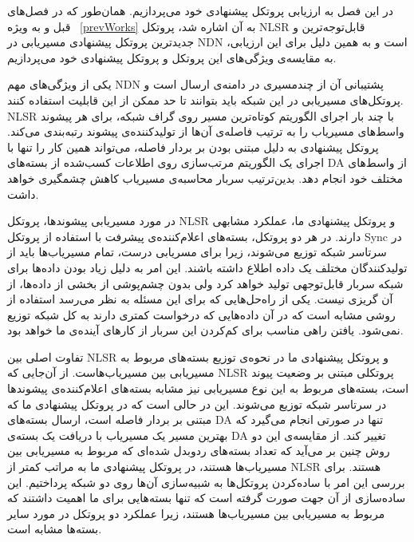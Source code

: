 
در این فصل به ارزیابی پروتکل پیشنهادی خود می‌پردازیم. همان‌طور که در فصل‌های قبل و به ویژه ~\ref{prevWorks} به آن اشاره شد، پروتکل NLSR قابل‌توجه‌ترین و جدیدترین پروتکل پیشنهادی مسیریابی در NDN است و به همین دلیل برای این ارزیابی، به مقایسه‌ی ویژگی‌های این پروتکل و پروتکل پیشنهادی خود می‌پردازیم.

یکی از ویژگی‌های مهم NDN پشتیبانی آن از چندمسیری در دامنه‌ی ارسال است و پروتکل‌های مسیریابی در این شبکه باید بتوانند تا حد ممکن از این قابلیت استفاده کنند. NLSR با چند بار اجرای الگوریتم کوتاه‌ترین مسیر روی گراف شبکه، برای هر پیشوند واسط‌های مسیریاب را به ترتیب فاصله‌ی آن‌ها از تولید‌کننده‌ی پیشوند رتبه‌بندی می‌کند. پروتکل پیشنهادی به دلیل مبتنی بودن بر بردار فاصله، می‌تواند همین کار را تنها با اجرای یک الگوریتم مرتب‌سازی روی اطلاعات کسب‌شده از بسته‌های DA از واسط‌های مختلف خود انجام دهد. بدین‌ترتیب سربار محاسبه‌ی مسیریاب کاهش چشمگیری خواهد داشت.

در مورد مسیریابی پیشوند‌ها، پروتکل NLSR و پروتکل پیشنهادی ما، عملکرد مشابهی دارند. در هر دو پروتکل، بسته‌های اعلام‌کننده‌ی پیشرفت با استفاده از پروتکل Sync در سرتاسر شبکه توزیع می‌شوند، زیرا برای مسریابی درست، تمام مسیریاب‌ها باید از تولیدکنندگان مختلف یک داده اطلاع داشته باشند. این امر به دلیل زیاد بودن داده‌ها برای شبکه سربار قابل‌توجهی تولید خواهد کرد ولی بدون چشم‌پوشی از بخشی از داده‌ها، از آن گریزی نیست. یکی از راه‌حل‌هایی که برای این مسئله به نظر می‌رسد استفاده از روشی مشابه \cite{two-layer} است که در آن داده‌هایی که درخواست کمتری دارند به کل شبکه توزیع نمی‌شود. یافتن راهی مناسب برای کم‌کردن این سربار از کارهای آینده‌ی ما خواهد بود.

تفاوت اصلی بین NLSR و پروتکل پیشنهادی ما در نحوه‌ی توزیع بسته‌های مربوط به مسیریابی بین مسیریاب‌هاست. از آن‌جایی که NLSR پروتکلی مبتنی بر وضعیت پیوند است، بسته‌های مربوط به این نوع مسیریابی نیز مشابه بسته‌های اعلام‌کننده‌ی پیشوندها در سرتاسر شبکه توزیع می‌شوند. این در حالی است که در پروتکل پیشنهادی ما که مبتنی بر بردار فاصله است، ارسال بسته‌های DA تنها در صورتی انجام می‌گیرد که بهترین مسیر یک مسیریاب با دریافت یک بسته‌ی DA  تغییر کند. از مقایسه‌ی این دو روش چنین بر می‌آید که تعداد بسته‌های ردوبدل شده‌ای که مربوط به مسیریابی بین مسیریاب‌ها هستند، در پروتکل پیشنهادی ما به مراتب کمتر از NLSR هستند. برای بررسی این امر با ساده‌کردن پروتکل‌ها به شبیه‌سازی آن‌ها روی دو شبکه پرداختیم. این ساده‌سازی از آن جهت صورت گرفته است که تنها بسته‌هایی برای ما اهمیت داشتند که مربوط به مسیریابی بین مسیریاب‌ها هستند، زیرا عملکرد دو پروتکل در مورد سایر بسته‌ها مشابه است. 

